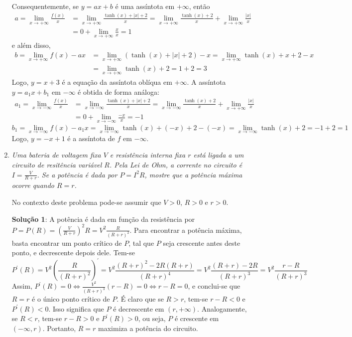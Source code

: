 \documentclass[12pt,a4paper]{article}
\newcommand*\abs[1]{\left|#1\right|}
\begin{document}
\begin{enumerate}
Consequentemente, se $y=ax+b$ é uma assíntota em $+\infty$, então
\begin{align*}
a = \lim_{x\to+\infty} \frac{ f(x) }{x}
& = \lim_{x\to+\infty} \frac{ \tanh(x) + \abs{x} + 2 }{x}
  = \lim_{x\to+\infty} \frac{ \tanh(x) + 2 }{x} + \lim_{x\to+\infty} \frac{ \abs{x} }{x} \\
& = 0 + \lim_{x\to+\infty} \frac{x}{x}
  = 1
\end{align*}
e além disso,
\begin{align*}
b = \lim_{x\to+\infty} f(x) - ax
& = \lim_{x\to+\infty} \left( \tanh(x) + \abs{x} + 2 \right) - x
  = \lim_{x\to+\infty} \tanh(x) + x + 2 - x \\
& = \lim_{x\to+\infty} \tanh(x) + 2
  = 1 + 2
  = 3
\end{align*}
Logo, $y=x+3$ é a equação da assíntota oblíqua em $+\infty$. A assíntota $y=a_1x+b_1$ em $-\infty$ é obtida de forma análoga:
\begin{align*}
a_1 = \lim_{x\to-\infty} \frac{ f(x) }{x}
& = \lim_{x\to-\infty} \frac{ \tanh(x) + \abs{x} + 2 }{x}
  = \lim_{x\to-\infty} \frac{ \tanh(x) + 2 }{x} + \lim_{x\to+\infty} \frac{ \abs{x} }{x} \\
& = 0 + \lim_{x\to-\infty} \frac{-x}{x}
  = -1
\end{align*}
\[
b_1 = \lim_{x\to-\infty} f(x) - a_1x = \lim_{x\to-\infty} \tanh(x) + (-x) + 2 - (-x) = \lim_{x\to-\infty} \tanh(x) + 2
  = -1 + 2
  = 1
\]
Logo, $y=-x+1$ é a assíntota de $f$ em $-\infty$.

\item \textit{Uma bateria de voltagem fixa $V$ e resistência interna fixa $r$ está ligada a um circuito de resitência variável $R$. Pela Lei de Ohm, a corrente no circuito é $I = \frac{V}{R+r}$. Se a potência é dada por $P = I^2R$, mostre que a potência máxima ocorre quando $R = r$.}

No contexto deste problema pode-se assumir que $V>0$, $R>0$ e $r>0$.

\textbf{Solução 1}:
A potência é dada em função da resistência por $P = P(R) = \left( \frac{V}{R+r}\right)^2 R = V^2 \frac{R}{(R+r)^2}$. Para encontrar a potência máxima, basta encontrar um ponto crítico de $P$, tal que $P$ seja crescente antes deste ponto, e decrescente depois dele. Tem-se
\[
P^\prime(R)
= V^2 \left( \frac{R}{(R+r)^2} \right)^\prime
= V^2 \frac{(R+r)^2 - 2 R (R+r)}{(R+r)^4}
= V^2 \frac{(R+r) - 2R}{(R+r)^3}
= V^2 \frac{r - R}{(R+r)^3}
\]
Assim, $P^\prime(R) = 0 \Leftrightarrow \frac{V^2}{(R+r)^3} (r - R) = 0 \Leftrightarrow r-R=0$, e conclui-se que $R=r$ é o único ponto crítico de $P$. É claro que se $R > r$, tem-se $r-R < 0$ e $P^\prime(R) < 0$. Isso significa que $P$ é decrescente em $(r, +\infty)$. Analogamente, se $R < r$, tem-se $r-R > 0$ e $P^\prime(R) > 0$, ou seja, $P$ é crescente em $(-\infty, r)$. Portanto, $R = r$ maximiza a potência do circuito.



\end{enumerate}
\end{document}
